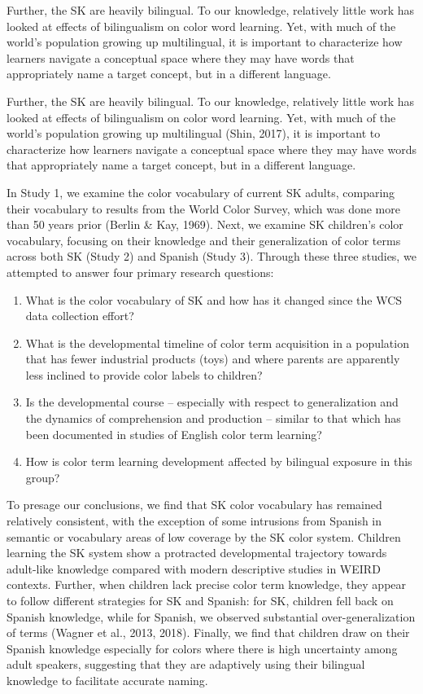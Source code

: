 \documentclass[
  ,apa7,floatsintext]{apa6}
\providecommand{\tightlist}{%
  \setlength{\itemsep}{0pt}\setlength{\parskip}{0pt}}
\begin{document}
Further, the SK are heavily bilingual. To our knowledge, relatively little work has looked at effects of bilingualism on color word learning. Yet, with much of the world's population growing up multilingual, it is important to characterize how learners navigate a conceptual space where they may have words that appropriately name a target concept, but in a different language.

Further, the SK are heavily bilingual. To our knowledge, relatively little work has looked at effects of bilingualism on color word learning. Yet, with much of the world's population growing up multilingual (Shin, 2017), it is important to characterize how learners navigate a conceptual space where they may have words that appropriately name a target concept, but in a different language.

In Study 1, we examine the color vocabulary of current SK adults, comparing their vocabulary to results from the World Color Survey, which was done more than 50 years prior (Berlin \& Kay, 1969). Next, we examine SK children's color vocabulary, focusing on their knowledge and their generalization of color terms across both SK (Study 2) and Spanish (Study 3). Through these three studies, we attempted to answer four primary research questions:

\begin{enumerate}
\def\labelenumi{\arabic{enumi}.}
\tightlist
\item
  What is the color vocabulary of SK and how has it changed since the WCS data collection effort?
\item
  What is the developmental timeline of color term acquisition in a population that has fewer industrial products (toys) and where parents are apparently less inclined to provide color labels to children?
\item
  Is the developmental course -- especially with respect to generalization and the dynamics of comprehension and production -- similar to that which has been documented in studies of English color term learning?
\item
  How is color term learning development affected by bilingual exposure in this group?
\end{enumerate}

To presage our conclusions, we find that SK color vocabulary has remained relatively consistent, with the exception of some intrusions from Spanish in semantic or vocabulary areas of low coverage by the SK color system. Children learning the SK system show a protracted developmental trajectory towards adult-like knowledge compared with modern descriptive studies in WEIRD contexts. Further, when children lack precise color term knowledge, they appear to follow different strategies for SK and Spanish: for SK, children fell back on Spanish knowledge, while for Spanish, we observed substantial over-generalization of terms (Wagner et al., 2013, 2018). Finally, we find that children draw on their Spanish knowledge especially for colors where there is high uncertainty among adult speakers, suggesting that they are adaptively using their bilingual knowledge to facilitate accurate naming.
\end{document}
